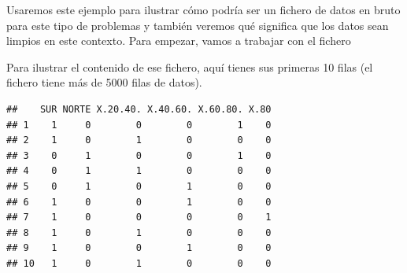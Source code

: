 \documentclass[10pt,a4paper]{article}\usepackage[]{graphicx}\usepackage[]{color}
\makeatletter
\newenvironment{kframe}{%
 \def\at@end@of@kframe{}%
 \ifinner\ifhmode%
  \def\at@end@of@kframe{\end{minipage}}%
  \begin{minipage}{\columnwidth}%
 \fi\fi%
 \def\FrameCommand##1{\hskip\@totalleftmargin \hskip-\fboxsep
 \colorbox{shadecolor}{##1}\hskip-\fboxsep
     \hskip-\linewidth \hskip-\@totalleftmargin \hskip\columnwidth}%
 \MakeFramed {\advance\hsize-\width
   \@totalleftmargin\z@ \linewidth\hsize
   \@setminipage}}%
 {\par\unskip\endMakeFramed%
 \at@end@of@kframe}
\newenvironment{knitrout}{}{} %
\newcounter {cont01}
\makeatother
\begin{document}

Usaremos este ejemplo para ilustrar cómo podría ser un fichero de datos en bruto para este tipo de problemas y también veremos qué significa que los datos sean limpios en este contexto. Para empezar, vamos a trabajar con el fichero
\begin{center}
\end{center}
Para ilustrar el contenido de ese fichero, aquí tienes sus primeras 10 filas (el fichero tiene más de 5000 filas de datos).


\begin{knitrout}
\color{fgcolor}\begin{kframe}
\begin{verbatim}
##    SUR NORTE X.20.40. X.40.60. X.60.80. X.80
## 1    1     0        0        0        1    0
## 2    1     0        1        0        0    0
## 3    0     1        0        0        1    0
## 4    0     1        1        0        0    0
## 5    0     1        0        1        0    0
## 6    1     0        0        1        0    0
## 7    1     0        0        0        0    1
## 8    1     0        1        0        0    0
## 9    1     0        0        1        0    0
## 10   1     0        1        0        0    0
\end{verbatim}
\end{kframe}
\end{knitrout}
\end{document}
